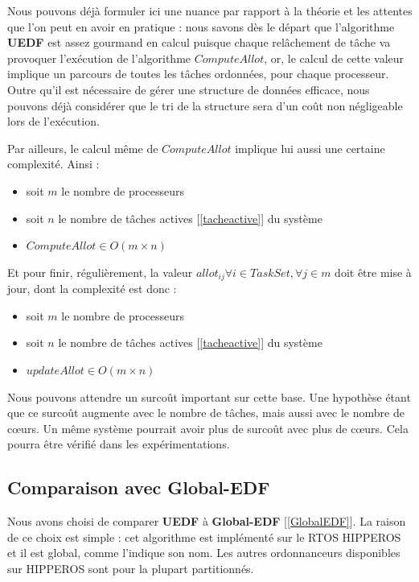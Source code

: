 	Nous pouvons déjà formuler ici une nuance par rapport à la théorie et les attentes que l'on peut en avoir 
	en pratique : 
	nous savons dès le départ que l'algorithme \textbf{UEDF} est assez gourmand en calcul puisque chaque relâchement de 
	tâche va provoquer l'exécution de l'algorithme $Compute Allot$, or, le calcul de cette valeur 
	implique un parcours de toutes les tâches ordonnées, pour chaque processeur. 
	Outre qu'il est nécessaire de gérer une structure de données efficace, nous pouvons 
	déjà considérer que le tri de la structure sera d'un coût non négligeable lors de l'exécution. \newline
	
	Par ailleurs, le calcul même de $Compute Allot$ implique lui aussi une certaine complexité.
	Ainsi :
	\begin{itemize}
		\setlength\itemsep{0.1em}
		\item soit $m$ le nombre de processeurs
		\item soit $n$ le nombre de tâches actives [\ref*{tacheactive}] du système
		\item $Compute Allot \in O(m\times n)$
	\end{itemize}

	Et pour finir, régulièrement, la valeur $allot_{ij} \forall i \in TaskSet, \forall j \in m$ doit être mise 
	à jour, dont la complexité est donc :
	\begin{itemize}
		\setlength\itemsep{0.1em}
			\item soit $m$ le nombre de processeurs
			\item soit $n$ le nombre de tâches actives [\ref*{tacheactive}] du système
			\item $update Allot \in O(m\times n)$
	\end{itemize}

	Nous pouvons attendre un surcoût important sur cette base. Une hypothèse étant que ce surcoût 
	augmente avec le nombre de tâches, mais aussi avec le nombre de cœurs. Un même système pourrait avoir plus 
	de surcoût avec plus de cœurs. Cela pourra être vérifié dans les expérimentations.

	
	\subsection{Comparaison avec Global-EDF}
	
	Nous avons choisi de comparer \textbf{UEDF} à \textbf{Global-EDF} [\ref*{GlobalEDF}]. 
	La raison de ce choix est simple : 
	cet algorithme est implémenté sur le RTOS HIPPEROS et il est global, comme 
	l'indique son nom. 
	Les autres ordonnanceurs disponibles sur HIPPEROS sont pour la plupart partitionnés.
 
